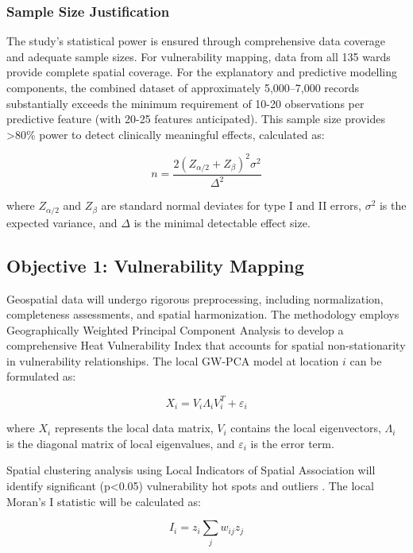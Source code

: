 \subsubsection{Sample Size Justification}
The study's statistical power is ensured through comprehensive data coverage and adequate sample sizes. For vulnerability mapping, data from all 135 wards provide complete spatial coverage. For the explanatory and predictive modelling components, the combined dataset of approximately 5,000--7,000 records substantially exceeds the minimum requirement of 10-20 observations per predictive feature (with 20-25 features anticipated). This sample size provides >80\% power to detect clinically meaningful effects, calculated as:

\begin{equation}
n = \frac{2(Z_{\alpha/2} + Z_{\beta})^2\sigma^2}{\Delta^2}
\end{equation}

where $Z_{\alpha/2}$ and $Z_{\beta}$ are standard normal deviates for type I and II errors, $\sigma^2$ is the expected variance, and $\Delta$ is the minimal detectable effect size.

\subsection{Objective 1: Vulnerability Mapping}
Geospatial data will undergo rigorous preprocessing, including normalization, completeness assessments, and spatial harmonization. The methodology employs Geographically Weighted Principal Component Analysis \citep{Harris2011} to develop a comprehensive Heat Vulnerability Index that accounts for spatial non-stationarity in vulnerability relationships. The local GW-PCA model at location $i$ can be formulated as:

\begin{equation}
X_i = V_i\Lambda_iV^T_i + \varepsilon_i
\end{equation}

where $X_i$ represents the local data matrix, $V_i$ contains the local eigenvectors, $\Lambda_i$ is the diagonal matrix of local eigenvalues, and $\varepsilon_i$ is the error term.

Spatial clustering analysis using Local Indicators of Spatial Association will identify significant (p<0.05) vulnerability hot spots and outliers \citep{Anselin1995}. The local Moran's I statistic will be calculated as:

\begin{equation}
I_i = z_i \sum_{j} w_{ij}z_j
\end{equation}

